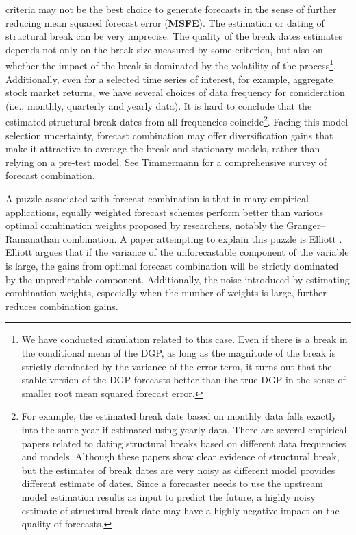 criteria may not be the best choice to generate forecasts in the sense of further reducing mean squared forecast error (\textbf{MSFE}). The estimation or dating of structural break can be very imprecise. The quality of the break dates estimates depends not only on the break size measured by some criterion, but also on whether the impact of the break is dominated by the volatility of the process\footnote{We have conducted simulation related to this case. Even if there is a break in the conditional mean of the DGP, as long as the magnitude of the break is strictly dominated by the variance of the error term, it turns out that the stable version of the DGP forecasts better than the true DGP in the sense of smaller root mean squared forecast error.}. Additionally, even for a selected time series of interest, for example, aggregate stock market returns, we have several choices of data frequency for consideration (i.e., monthly, quarterly and yearly data). It is hard to conclude that the estimated structural break dates from all frequencies coincide\footnote{For example, the estimated break date based on monthly data falls exactly into the same year if estimated using yearly data. There are several empirical papers related to dating structural breaks based on different data frequencies and models. Although these papers show clear evidence of structural break, but the estimates of break dates are very noisy as different model provides different estimate of dates. Since a forecaster needs to use the upstream model estimation results as input to predict the future, a highly noisy estimate of structural break date may have a highly negative impact on the quality of forecasts.}. Facing this model selection uncertainty, forecast combination may offer diversification gains that make it attractive to average the break and stationary models, rather than relying on a pre-test model. See Timmermann \cite{timmermann2006forecast} for a comprehensive survey of forecast combination.

A puzzle associated with forecast combination is that in many empirical applications, equally weighted forecast schemes perform better than various optimal combination weights proposed by researchers, notably the Granger--Ramanathan combination. A paper attempting to explain this puzzle is Elliott \cite{elliott11}. Elliott argues that if the variance of the unforecastable component of the variable is large, the gains from optimal forecast combination will be strictly dominated by the unpredictable component. Additionally, the noise introduced by estimating combination weights, especially when the number of weights is large, further reduces combination gains.

